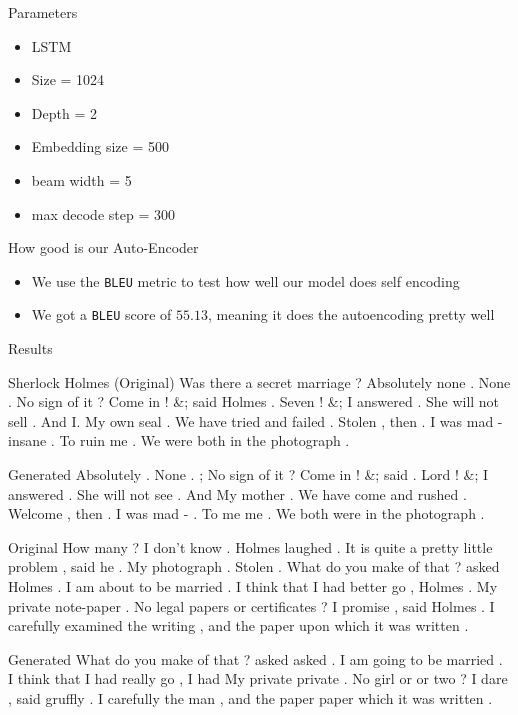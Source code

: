 \documentclass{beamer}
\begin{document}
\begin{frame}{Parameters}
\begin{itemize}
\item LSTM
\item Size = 1024
\item Depth = 2
\item Embedding size = 500
\item beam width = 5
\item max decode step = 300
\end{itemize}
\end{frame}
\begin{frame}{How good is our Auto-Encoder}
\begin{itemize}
    \item We use the \texttt{BLEU} metric to test how well our model does self encoding
    \item We got a \texttt{BLEU} score of $55.13$, meaning it does the autoencoding pretty well
\end{itemize}
\end{frame}

\begin{frame}{Results}
    \begin{block}{Sherlock Holmes (Original)}
        Was there a secret marriage ? 
Absolutely none . 
None . 
No sign of it ? 
Come in ! \&; said Holmes .
Seven ! \&; I answered .
She will not sell . 
And I. 
My own seal . 
We have tried and failed . 
Stolen , then . 
I was mad - insane . 
To ruin me . 
We were both in the photograph . 
    \end{block}
    
    \begin{block}{Generated}
    Absolutely .
    None .
    ; No sign of it ? 
    Come in ! \&; said . 
    Lord ! &; I answered .
    She will not see . 
    And 
    My mother . 
    We have come and rushed . 
    Welcome , then . 
    I was mad - . 
    To me me . 
    We both were in the photograph .
    \end{block}
\end{frame}

\begin{frame}
\begin{block}{Original}
    How many ? I don't know . 
Holmes laughed .  It is quite a pretty little problem ,  said he .
 My photograph . 
 Stolen . 
What do you make of that ? asked Holmes .
 I am about to be married . 
 I think that I had better go , Holmes . 
 My private note-paper . 
 No legal papers or certificates ? 
 I promise ,  said Holmes .
I carefully examined the writing , and the paper upon which it was written .

\end{block}

\begin{block}{Generated}
 What do you make of that ?  asked asked .
 I am going to be married .
 I think that I had really go , I had
 My private private .
 No girl or or two ? 
 I dare , said gruffly .
I carefully the man , and the paper paper which it was written .
\end{block}
\end{frame}
\end{document}
